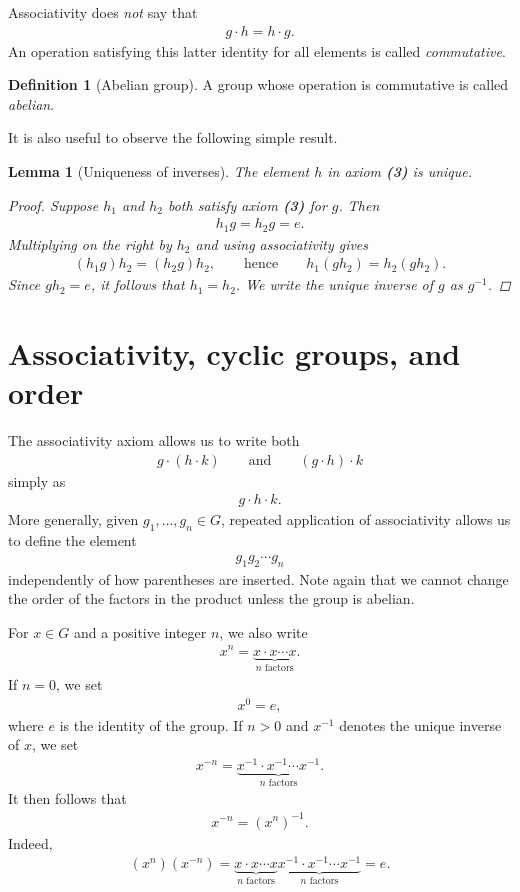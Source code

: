 \documentclass[reqno,11pt]{amsart}
\theoremstyle{definition}
\newtheorem{definition}{Definition}[section]
\theoremstyle{plain}
\newtheorem{lemma}{Lemma}[section]
\theoremstyle{remark}
\numberwithin{equation}{section}
\newcommand{\be}{\begin{eqnarray}}
\newcommand{\ee}{\end{eqnarray}}
\begin{document}
Associativity does \emph{not} say that
\be
g\cdot h=h\cdot g.
\ee
An operation satisfying this latter identity for all elements is called \emph{commutative}.


\begin{definition}[Abelian group]
	A group whose operation is commutative is called \emph{abelian}.
\end{definition}

It is also useful to observe the following simple result.


\begin{lemma}[Uniqueness of inverses]
	The element $h$ in axiom \textbf{(3)} is unique.

	\begin{proof}
		Suppose $h_1$ and $h_2$ both satisfy axiom \textbf{(3)} for $g$. Then
		\be
		h_1g=h_2g=e.
		\ee
				Multiplying on the right by $h_2$ and using associativity gives
		\be
		(h_1g)h_2=(h_2g)h_2,
		\qquad\text{hence}\qquad
		h_1(gh_2)=h_2(gh_2).
		\ee
				Since $gh_2=e$, it follows that $h_1=h_2$. We write the unique inverse of
		$g$ as $g^{-1}$.
	\end{proof}
\end{lemma}


\section{Associativity, cyclic groups, and order}


The associativity axiom allows us to write both
\be
g\cdot(h\cdot k)
  \qquad\text{and}\qquad
(g\cdot h)\cdot k
\ee
simply as
\be
g\cdot h\cdot k.
\ee
More generally, given $g_1,\ldots,g_n\in G$, repeated application of
associativity allows us to define the element
\be
g_1g_2\cdots g_n
\ee
independently of how parentheses are inserted. Note again that we cannot
change the order of the factors in the product unless the group is abelian.


For $x\in G$ and a positive
integer $n$, we also write
\be
x^n=\underbrace{x\cdot x\cdots x}_{n\text{ factors}}.
\ee
If $n=0$, we set
\be
x^0=e,
\ee
where $e$ is the identity of the group. If $n>0$ and $x^{-1}$ denotes the
unique inverse of $x$, we set
\be
x^{-n}=\underbrace{x^{-1}\cdot x^{-1}\cdots x^{-1}}_{n\text{ factors}}.
\ee
It then follows that
\be
\label{xn:inv}
x^{-n}=(x^n)^{-1}.
\ee
Indeed,
\be
(x^n)(x^{-n})
=\underbrace{x\cdot x\cdots x}_{n\text{ factors}}
 \underbrace{x^{-1}\cdot x^{-1}\cdots x^{-1}}_{n\text{ factors}}
=e.
\ee

\newcommand{\ord}{\mathrm{ord}}
\end{document}

